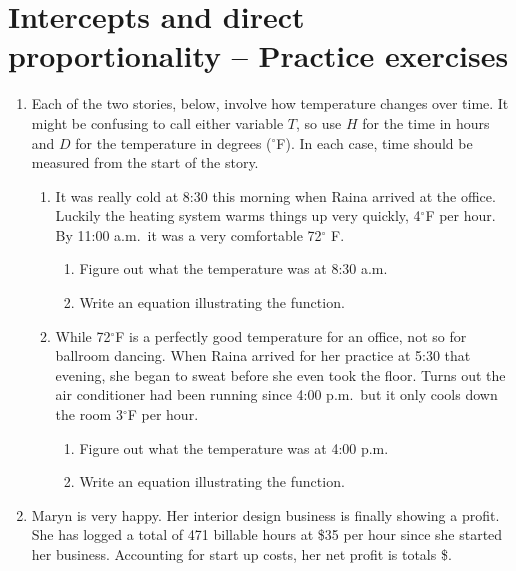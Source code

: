 \section{Intercepts and direct proportionality -- Practice exercises}

\begin{enumerate}

\item Each of the two stories, below, involve how temperature changes over time.  It might be confusing to call either variable $T$, so use $H$ for the time in hours and $D$ for the temperature in degrees ($^{\circ}$F).  In each case, time should be measured from the start of the story.
\begin{enumerate}
\item It was really cold at 8:30 this morning when Raina arrived at the office.  Luckily the heating system warms things up very quickly, 4$^\circ$F per hour.  By 11:00 a.m.\  it was a very comfortable 72$^\circ$ F.
\begin{enumerate}
\item Figure out what the temperature was at 8:30 a.m.  \vfill
\item Write an equation illustrating the function.   \vfill
\end{enumerate}
\item While 72$^\circ$F is a perfectly good temperature for an office, not so for ballroom dancing. When Raina arrived for her practice at 5:30 that evening, she began to sweat before she even took the floor.  Turns out the air conditioner had been running since 4:00 p.m.\ but it only cools down the room 3$^\circ$F per hour.
\begin{enumerate}
\item Figure out what the temperature was at 4:00 p.m.   \vfill
\item Write an equation illustrating the function.   \vfill
\end{enumerate}
\end{enumerate}

\newpage %

\item Maryn is very happy.  Her interior design business is finally showing a profit.  She has logged a total of 471 billable hours at \$35 per hour since she started her business.  Accounting for start up costs, her net profit is totals  \$.


\end{enumerate}
